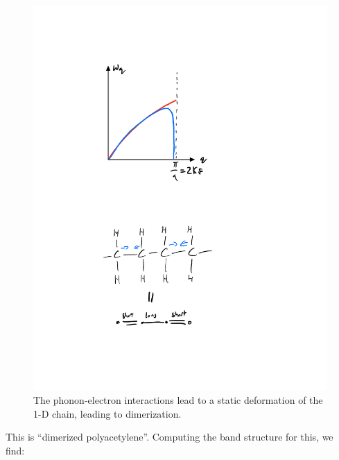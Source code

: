 \begin{figure}[htbp]
    \centering
    \includegraphics[scale=0.5]{Images/fig-polyacedimerization.pdf}
    \caption{The phonon-electron interactions lead to a static deformation of the 1-D chain, leading to dimerization.}
    \label{fig-polyacedimerization}
\end{figure}

This is ``dimerized polyacetylene''. Computing the band structure for this, we find:

